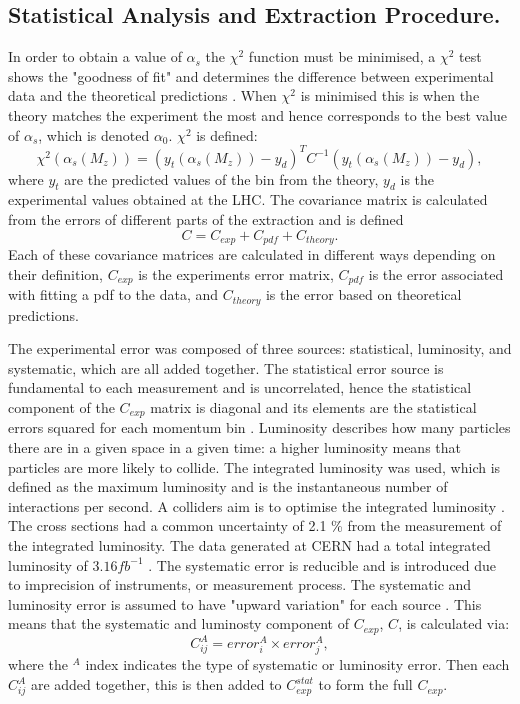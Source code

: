 \documentclass[12pt, onecolumn]{revtex4}    %
\begin{document}
\subsection{Statistical Analysis and Extraction Procedure.} \label{stats}
In order to obtain a value of ${\alpha_s}$ the ${\chi^2}$ function must be minimised, a ${\chi^2}$ test shows the "goodness of fit" and determines the difference between experimental data and the theoretical predictions \cite{STAT}. When ${\chi^2}$ is minimised this is when the theory matches the experiment the most and hence corresponds to the best value of ${\alpha_s}$, which is denoted ${\alpha_0}$. ${\chi^2}$  is defined:  \begin{equation} \chi^2(\alpha_s(M_z)) = (y_t(\alpha_s(M_z))-y_d)^TC^{-1}(y_t(\alpha_s(M_z))-y_d), \end{equation} where ${y_t}$ are the predicted values of the bin from the theory, ${y_d}$ is the experimental values obtained at the LHC. The covariance matrix is calculated from the errors of different parts of the extraction and is defined \begin{equation} C = C_{exp} + C_{pdf} + C_{theory}. \end{equation} Each of these covariance matrices are calculated in different ways depending on their definition, ${C_{exp}}$ is the experiments error matrix, ${C_{pdf}}$ is the error associated with fitting a pdf to the data, and ${C_{theory}}$ is the error based on theoretical predictions. 

The experimental error was composed of three sources: statistical, luminosity, and systematic, which are all added together. The statistical error source  is fundamental to each measurement and is uncorrelated, hence the statistical component of the ${C_{exp}}$ matrix is diagonal and its elements are the statistical errors squared for each momentum bin \cite{DMP}. Luminosity describes how many particles there are in a given space in a given time: a higher luminosity means that particles are more likely to collide. The integrated luminosity was used, which is defined as the maximum luminosity and is the instantaneous number of interactions per second. A colliders aim is to optimise the integrated luminosity \cite{LUM}. The cross sections had a common uncertainty of 2.1 \% from the measurement of the integrated luminosity. The data generated at CERN had a total integrated luminosity of ${3.16   fb^{-1}}$ \cite{HEPP}. The systematic error is reducible and is introduced due to imprecision of instruments, or measurement process. The systematic and luminosity error is assumed to have "upward variation" for each source \cite{HEPD}. This means that the systematic and luminosty component of  ${C_{exp}}$, ${C}$, is calculated via: \begin{equation} \label{Cov} C_{ij}^{A} =  error^{A}_{i} \times error^{A}_{j}, \end{equation} where the ${^A}$ index indicates the type of systematic or luminosity error. Then each ${C_{ij}^{A}}$ are added together, this is then added to ${C_{exp}^{stat}}$ to form the full ${C_{exp}}$.
\end{document}
